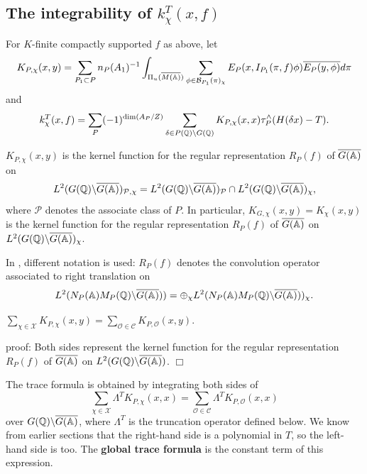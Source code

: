 
\subsection{The integrability of $k_\chi ^T(x,f)$}

For $K$-finite compactly supported $f$ as above, let 
\begin{equation}\label{eq:5.12}
K_{P,\chi }(x,y)=\sum_{P_1\subset P}n_P(A_1)^{-1}
\int_{\Pi _u(\overline{M(\mathbb{A} )})}
\sum_{\phi \in {\mathcal{B}}_{P_1}(\pi )_\chi }
E_P(x,I_{P_1}(\pi ,f)\phi )\overline{E_P(y,\phi )}d\pi
\end{equation}
and 
\begin{equation}\label{eq:5.13}
k_\chi ^T(x,f)=\sum_P(-1)^{\dim (A_P/Z)}
\sum_{\delta \in P(\mathbb{Q} )\backslash G(\mathbb{Q} )}
K_{P,\chi }(x,x)\tau _P^{\wedge }(H(\delta x)-T).
\end{equation}

\begin{lemma}\label{lem:5.9}
$K_{P,\chi }(x,y)$ is the kernel function for the regular 
representation $R_P(f)$ of $\overline{G(\mathbb{A} )}$ on 
\[
L^2(G(\mathbb{Q} )\backslash \overline{G(\mathbb{A} )})_{\mathcal{P},\chi }
=L^2(G(\mathbb{Q} )\backslash \overline{G(\mathbb{A} )})_{\mathcal{P}}
\cap L^2(G(\mathbb{Q} )\backslash \overline{G(\mathbb{A} )})_{\chi},
\]
where $\mathcal{P}$ denotes the associate class of $P$. In particular,
$K_{G,\chi }(x,y)=K_\chi (x,y)$ is the kernel function for the regular
representation $R_P(f)$ of $\overline{G(\mathbb{A} )}$ on
$L^2(G(\mathbb{Q} )\backslash \overline{G(\mathbb{A} )})_\chi $.
\end{lemma}

\begin{remark}\label{rem:5.10} In \cite{A15}, different notation is used: $R_P(f)$ denotes
the convolution operator associated to right translation on
\[
L^2(N_P(\mathbb{A} )M_P(\mathbb{Q} )\backslash \overline{G(\mathbb{A} )}))
=\oplus_\chi
L^2(N_P(\mathbb{A} )M_P(\mathbb{Q} )\backslash \overline{G(\mathbb{A} )}))_\chi .
\]
\end{remark}

\begin{theorem}\label{thm:5.11}
$\sum_{\chi \in \mathcal{X}}K_{P,\chi }(x,y)
=\sum_{{\mathcal O}\in \mathcal{C}}
K_{P,{\mathcal O}}(x,y)$.
\end{theorem}

proof: Both sides represent the kernel function for the regular
representation $R_P(f)$ of $\overline{G(\mathbb{A} )}$
on $L^2(G(\mathbb{Q} )\backslash \overline{G(\mathbb{A} )})$. $\Box $

The trace formula is obtained by integrating both sides of 
\[
\sum_{\chi \in \mathcal{X}}\Lambda ^TK_{P,\chi }(x,x)
=\sum_{{\mathcal O}\in \mathcal{C}}
\Lambda ^TK_{P,{\mathcal O}}(x,x) 
\]
over $G(\mathbb{Q} )\backslash \overline{G(\mathbb{A} )}$,
where $\Lambda ^T$ is the
truncation operator defined below. We know from earlier sections that the
right-hand side is a polynomial in $T$, so the left-hand side is too. The 
\textbf{global trace formula} is the constant term of this expression. 

